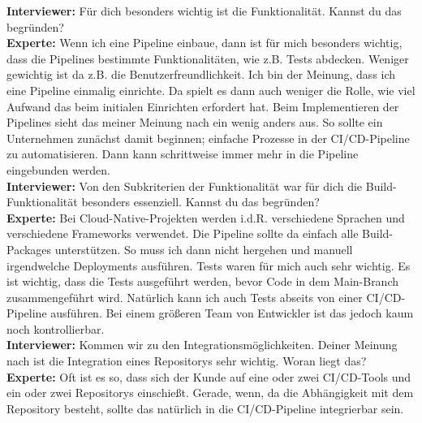     \begin{center}
        \begin{figure}[H]
            \centering
            \label{fig:gew_13}
        \end{figure}	
    \end{center}
    \newpage
    \resetlinenumber
    \begin{linenumbers}
        \textbf{Interviewer:} Für dich besonders wichtig ist die Funktionalität. Kannst du das begründen?\\
        \textbf{Experte:} Wenn ich eine Pipeline einbaue, dann ist für mich besonders wichtig, dass die Pipelines bestimmte Funktionalitäten, wie z.B. Tests abdecken. Weniger gewichtig ist da z.B. die Benutzerfreundlichkeit. Ich bin der Meinung, dass ich eine Pipeline einmalig einrichte. Da spielt es dann auch weniger die Rolle, wie viel Aufwand das beim initialen Einrichten erfordert hat. Beim Implementieren der Pipelines sieht das meiner Meinung nach ein wenig anders aus. So sollte ein Unternehmen zunächst damit beginnen; einfache Prozesse in der CI/CD-Pipeline zu automatisieren. Dann kann schrittweise immer mehr in die Pipeline eingebunden werden.\\
            \textbf{Interviewer:} Von den Subkriterien der Funktionalität war für dich die Build-Funktionalität besonders essenziell. Kannst du das begründen?\\
            \textbf{Experte:} Bei Cloud-Native-Projekten werden i.d.R. verschiedene Sprachen und verschiedene Frameworks verwendet. Die Pipeline sollte da einfach alle Build-Packages unterstützen. So muss ich dann nicht hergehen und manuell irgendwelche Deployments ausführen. Tests waren für mich auch sehr wichtig. Es ist wichtig, dass die Tests ausgeführt werden, bevor Code in dem Main-Branch zusammengeführt wird. Natürlich kann ich auch Tests abseits von einer CI/CD-Pipeline ausführen. Bei einem größeren Team von Entwickler ist das jedoch kaum noch kontrollierbar.\\
            \textbf{Interviewer:} Kommen wir zu den Integrationsmöglichkeiten. Deiner Meinung nach ist die Integration eines Repositorys sehr wichtig. Woran liegt das?\\
            \textbf{Experte:} Oft ist es so, dass sich der Kunde auf eine oder zwei CI/CD-Tools und ein oder zwei Repositorys einschießt. Gerade, wenn, da die Abhängigkeit mit dem Repository besteht, sollte das natürlich in die CI/CD-Pipeline integrierbar sein.\\

\end{linenumbers}
